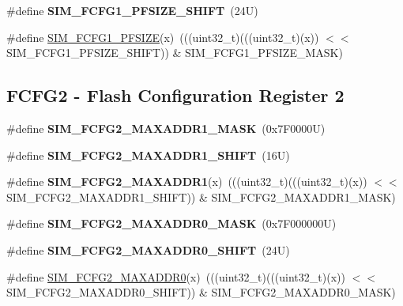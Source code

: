 \begin{DoxyCompactItemize}
\item 
\mbox{\label{group___s_i_m___register___masks_gaec8960bc114f5539e22701491dcf58f7}} 
\#define {\bfseries S\+I\+M\+\_\+\+F\+C\+F\+G1\+\_\+\+P\+F\+S\+I\+Z\+E\+\_\+\+S\+H\+I\+FT}~(24\+U)
\item 
\#define \mbox{\hyperlink{group___s_i_m___register___masks_ga7527f7f4bdcd4c0b2baf6c99a5b6735a}{S\+I\+M\+\_\+\+F\+C\+F\+G1\+\_\+\+P\+F\+S\+I\+ZE}}(x)~(((uint32\+\_\+t)(((uint32\+\_\+t)(x)) $<$$<$ S\+I\+M\+\_\+\+F\+C\+F\+G1\+\_\+\+P\+F\+S\+I\+Z\+E\+\_\+\+S\+H\+I\+FT)) \& S\+I\+M\+\_\+\+F\+C\+F\+G1\+\_\+\+P\+F\+S\+I\+Z\+E\+\_\+\+M\+A\+SK)
\end{DoxyCompactItemize}
\subsection*{F\+C\+F\+G2 -\/ Flash Configuration Register 2}
\begin{DoxyCompactItemize}
\item 
\mbox{\label{group___s_i_m___register___masks_ga4a9efde69ef5ab882d94b4ff6f659493}} 
\#define {\bfseries S\+I\+M\+\_\+\+F\+C\+F\+G2\+\_\+\+M\+A\+X\+A\+D\+D\+R1\+\_\+\+M\+A\+SK}~(0x7\+F0000\+U)
\item 
\mbox{\label{group___s_i_m___register___masks_ga4efd23d8fd9d589919b9b211ab523e09}} 
\#define {\bfseries S\+I\+M\+\_\+\+F\+C\+F\+G2\+\_\+\+M\+A\+X\+A\+D\+D\+R1\+\_\+\+S\+H\+I\+FT}~(16\+U)
\item 
\mbox{\label{group___s_i_m___register___masks_gaadeff570babcc1f87581f48ca4d2951f}} 
\#define {\bfseries S\+I\+M\+\_\+\+F\+C\+F\+G2\+\_\+\+M\+A\+X\+A\+D\+D\+R1}(x)~(((uint32\+\_\+t)(((uint32\+\_\+t)(x)) $<$$<$ S\+I\+M\+\_\+\+F\+C\+F\+G2\+\_\+\+M\+A\+X\+A\+D\+D\+R1\+\_\+\+S\+H\+I\+FT)) \& S\+I\+M\+\_\+\+F\+C\+F\+G2\+\_\+\+M\+A\+X\+A\+D\+D\+R1\+\_\+\+M\+A\+SK)
\item 
\mbox{\label{group___s_i_m___register___masks_gad1096c0a75d0bf4dfc93f4b1957fe493}} 
\#define {\bfseries S\+I\+M\+\_\+\+F\+C\+F\+G2\+\_\+\+M\+A\+X\+A\+D\+D\+R0\+\_\+\+M\+A\+SK}~(0x7\+F000000\+U)
\item 
\mbox{\label{group___s_i_m___register___masks_ga3ccb8fde0ef2e170d0c84cdfa3651d34}} 
\#define {\bfseries S\+I\+M\+\_\+\+F\+C\+F\+G2\+\_\+\+M\+A\+X\+A\+D\+D\+R0\+\_\+\+S\+H\+I\+FT}~(24\+U)
\item 
\#define \mbox{\hyperlink{group___s_i_m___register___masks_gae7829e3338a5d460d360b8ed9e06e1e1}{S\+I\+M\+\_\+\+F\+C\+F\+G2\+\_\+\+M\+A\+X\+A\+D\+D\+R0}}(x)~(((uint32\+\_\+t)(((uint32\+\_\+t)(x)) $<$$<$ S\+I\+M\+\_\+\+F\+C\+F\+G2\+\_\+\+M\+A\+X\+A\+D\+D\+R0\+\_\+\+S\+H\+I\+FT)) \& S\+I\+M\+\_\+\+F\+C\+F\+G2\+\_\+\+M\+A\+X\+A\+D\+D\+R0\+\_\+\+M\+A\+SK)
\end{DoxyCompactItemize}
